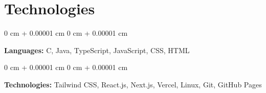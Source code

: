 \documentclass[10pt, letterpaper]{article}
\newenvironment{onecolentry}{
    \begin{adjustwidth}{
        0 cm + 0.00001 cm
    }{
        0 cm + 0.00001 cm
    }
}{
    \end{adjustwidth}
} %
\begin{document}
    \section{Technologies}

        \begin{onecolentry}
            \textbf{Languages:} C, Java, TypeScript, JavaScript, CSS, HTML
        \end{onecolentry}
        \vspace{0.2 cm}
        \begin{onecolentry}
            \textbf{Technologies:} Tailwind CSS, React.js, Next.js, Vercel, Linux, Git, GitHub Pages
        \end{onecolentry}
\end{document}
